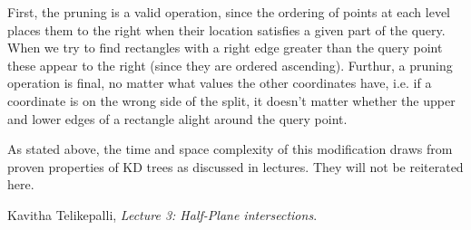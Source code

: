 First, the pruning is a valid operation, since the ordering of points at each level places them to the right when their location satisfies a given part of the query.
When we try to find rectangles with a right edge greater than the query point these appear to the right (since they are ordered ascending).
Furthur, a pruning operation is final, no matter what values the other coordinates have, i.e. if a coordinate is on the wrong side of the split, it doesn't matter whether the upper and lower edges of a rectangle alight around the query point.

As stated above, the time and space complexity of this modification draws from proven properties of KD trees as discussed in lectures.
They will not be reiterated here.

\begin{thebibliography}{9}

  Kavitha Telikepalli,
  \emph{Lecture 3: Half-Plane intersections}.

\end{thebibliography}


